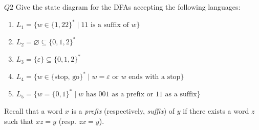 \documentclass{article}
\theoremstyle{definition}
\theoremstyle{definition}
\theoremstyle{remark}
\begin{document}
\begin{questionbox}{$Q2$}
    Give the state diagram for the DFAs accepting the following languages:
    \begin{enumerate}
        \item[$(i)$] $L_1=\bigl\{w\in\{1,22\}^\ast\mid11\text{ is a suffix of }w\bigr\}$
        
        \item[$(ii)$] $L_2=\varnothing\subseteq\{0,1,2\}^\ast$
    
        \item[$(iii)$] $L_3=\{\varepsilon\}\subseteq\{0,1,2\}^\ast$
    
        \item[$(iv)$] $L_4=\bigl\{w\in\{\text{stop},\,\text{go}\}^\ast\mid w=\varepsilon\text{ or }w\text{ ends with a stop}\bigr\}$
    
        \item[$(v)$] $L_5=\bigl\{w=\{0,1\}^\ast\mid w\text{ has }001\text{ as a prefix or }11\text{ as a suffix}\bigr\}$
    \end{enumerate}
    Recall that a word $x$ is a \textit{prefix} (respectively, \textit{suffix}) of $y$ if there exists a word $z$ such that $xz=y$ (resp. $zx=y$).
\end{questionbox}

\bigskip
\end{document}
